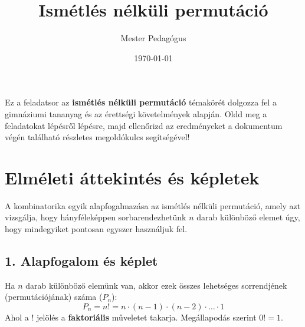 \documentclass[12pt,a4paper]{article}
\title{Ismétlés nélküli permutáció}
\author{Mester Pedagógus}
\date{\today}
\begin{document}
\maketitle

\begin{center}
    \begin{tcolorbox}[colback=blue!5!white,colframe=blue!75!black,width=0.9\textwidth,arc=4mm,title=\textbf{Üdvözlet a gyakorlóhoz!}]
    Ez a feladatsor az \textbf{ismétlés nélküli permutáció} témakörét dolgozza fel a gimnáziumi tananyag és az érettségi követelmények alapján. Oldd meg a feladatokat lépésről lépésre, majd ellenőrizd az eredményeket a dokumentum végén található részletes megoldókulcs segítségével!
    \end{tcolorbox}
\end{center}

\vspace{0.5cm}

\section*{Elméleti áttekintés és képletek}

A kombinatorika egyik alapfogalmazása az ismétlés nélküli permutáció, amely azt vizsgálja, hogy hányféleképpen sorbarendezhetünk $n$ darab különböző elemet úgy, hogy mindegyiket pontosan egyszer használjuk fel.

\subsection*{1. Alapfogalom és képlet}
Ha $n$ darab különböző elemünk van, akkor ezek összes lehetséges sorrendjének (permutációjának) száma ($P_n$):
\begin{equation}
    P_n = n! = n \cdot (n - 1) \cdot (n - 2) \cdot \ldots \cdot 1
\end{equation}
Ahol a $!$ jelölés a \textbf{faktoriális} műveletet takarja. Megállapodás szerint $0! = 1$.
\end{document}
